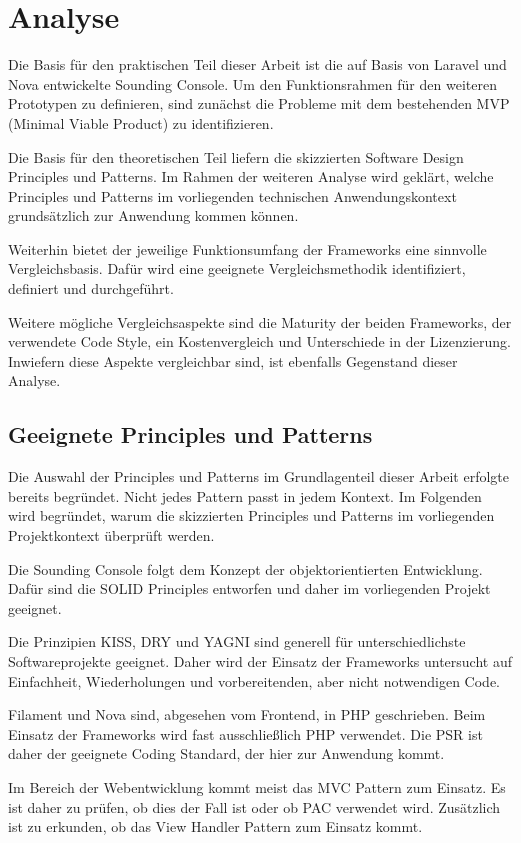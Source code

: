 \section{Analyse}
Die Basis für den praktischen Teil dieser Arbeit ist die auf Basis von Laravel und Nova entwickelte Sounding Console.
Um den Funktionsrahmen für den weiteren Prototypen zu definieren, sind zunächst die Probleme mit dem bestehenden MVP (Minimal Viable Product) zu identifizieren.

Die Basis für den theoretischen Teil liefern die skizzierten Software Design Principles und Patterns.
Im Rahmen der weiteren Analyse wird geklärt, welche Principles und Patterns im vorliegenden technischen Anwendungskontext grundsätzlich zur Anwendung kommen können.

Weiterhin bietet der jeweilige Funktionsumfang der Frameworks eine sinnvolle Vergleichsbasis.
Dafür wird eine geeignete Vergleichsmethodik identifiziert, definiert und durchgeführt.

Weitere mögliche Vergleichsaspekte sind die Maturity der beiden Frameworks, der verwendete Code Style, ein Kostenvergleich und Unterschiede in der Lizenzierung.
Inwiefern diese Aspekte vergleichbar sind, ist ebenfalls Gegenstand dieser Analyse.

\subsection{Geeignete Principles und Patterns}
Die Auswahl der Principles und Patterns im Grundlagenteil dieser Arbeit erfolgte bereits begründet.
Nicht jedes Pattern passt in jedem Kontext.
Im Folgenden wird begründet, warum die skizzierten Principles und Patterns im vorliegenden Projektkontext überprüft werden.

Die Sounding Console folgt dem Konzept der objektorientierten Entwicklung.
Dafür sind die SOLID Principles entworfen und daher im vorliegenden Projekt geeignet.

Die Prinzipien KISS, DRY und YAGNI sind generell für unterschiedlichste Softwareprojekte geeignet.
Daher wird der Einsatz der Frameworks untersucht auf Einfachheit, Wiederholungen und vorbereitenden, aber nicht notwendigen Code.

Filament und Nova sind, abgesehen vom Frontend, in PHP geschrieben.
Beim Einsatz der Frameworks wird fast ausschließlich PHP verwendet.
Die PSR ist daher der geeignete Coding Standard, der hier zur Anwendung kommt.

Im Bereich der Webentwicklung kommt meist das MVC Pattern zum Einsatz.
Es ist daher zu prüfen, ob dies der Fall ist oder ob PAC verwendet wird.
Zusätzlich ist zu erkunden, ob das View Handler Pattern zum Einsatz kommt.

